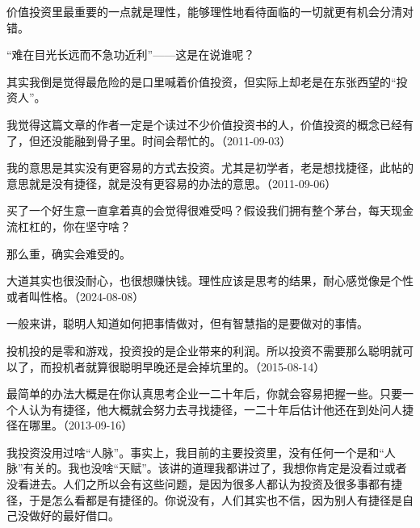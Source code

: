 价值投资里最重要的一点就是理性，能够理性地看待面临的一切就更有机会分清对错。

“难在目光长远而不急功近利”——这是在说谁呢？

其实我倒是觉得最危险的是口里喊着价值投资，但实际上却老是在东张西望的“投资人”。

我觉得这篇文章的作者一定是个读过不少价值投资书的人，价值投资的概念已经有了，但还没能融到骨子里。时间会帮忙的。（2011-09-03）


我的意思是其实没有更容易的方式去投资。尤其是初学者，老是想找捷径，此帖的意思就是没有捷径，就是没有更容易的办法的意思。（2011-09-06）


买了一个好生意一直拿着真的会觉得很难受吗？假设我们拥有整个茅台，每天现金流杠杠的，你在坚守啥？


那么重，确实会难受的。


大道其实也很没耐心，也很想赚快钱。理性应该是思考的结果，耐心感觉像是个性或者叫性格。（2024-08-08）

一般来讲，聪明人知道如何把事情做对，但有智慧指的是要做对的事情。

投机投的是零和游戏，投资投的是企业带来的利润。所以投资不需要那么聪明就可以了，而投机者就算很聪明早晚还是会掉坑里的。（2015-08-14）


最简单的办法大概是在你认真思考企业一二十年后，你就会容易把握一些。只要一个人认为有捷径，他大概就会努力去寻找捷径，一二十年后估计他还在到处问人捷径在哪里。（2013-09-16）


我投资没用过啥“人脉”。事实上，我目前的主要投资里，没有任何一个是和“人脉”有关的。我也没啥“天赋”。该讲的道理我都讲过了，我想你肯定是没看过或者没看进去。人们之所以会有这些问题，是因为很多人都认为投资及很多事都有捷径，于是怎么看都是有捷径的。你说没有，人们其实也不信，因为别人有捷径是自己没做好的最好借口。

